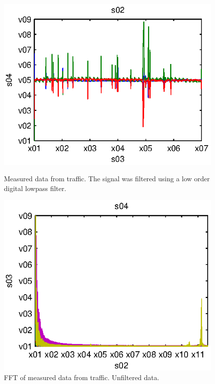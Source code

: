 \begin{subfigures}
\begin{figure}[!htb]
  \centering
  \begin{minipage}{0.45\linewidth}
  \centering
   
   \includegraphics[width=\linewidth]{images/traffic_data_filt}
  \caption[Measured data from traffic.]{Measured data from traffic. The signal was filtered using a low order digital lowpass filter.}
  \label{fig-traffic}
  \end{minipage}\hfill
  \begin{minipage}{0.45\linewidth}
   \centering
     
   \includegraphics[width=\linewidth]{images/traffic_data_fft}
  \caption[FFT of measured data from traffic.]{FFT of measured data from traffic. Unfiltered data.}
  \label{fig-traffic_fft}
  \end{minipage}
 \end{figure}
\end{subfigures}

